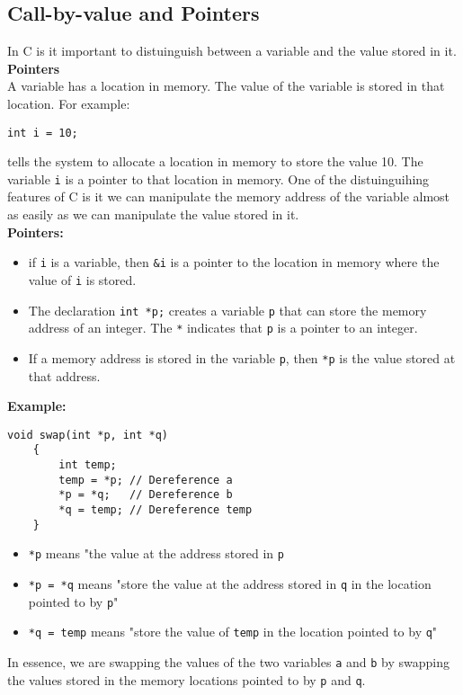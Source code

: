 \documentclass[a4paper, 10pt]{article}
\begin{document}
\subsection{Call-by-value and Pointers}
In C is it important to distuinguish between a variable and the value stored in it. \\[2ex]
\textbf{Pointers} \\
A variable has a location in memory. The value of the variable is stored in that location. For example:
\begin{lstlisting}[style=cStyle]
int i = 10;
\end{lstlisting}
tells the system to allocate a location in memory to store the value 10. The variable \texttt{i} is a pointer to that location in memory. One of the distuinguihing features of C is it we can manipulate the memory address of the variable almost as easily as we can manipulate the value stored in it. \\[2ex]
\textbf{Pointers:}
\begin{itemize}
    \item if \texttt{i} is a variable, then \texttt{\&i} is a pointer to the location in memory where the value of \texttt{i} is stored.
    \item The declaration \texttt{int *p;} creates a variable \texttt{p} that can store the memory address of an integer. The \texttt{*} indicates that \texttt{p} is a pointer to an integer.
    \item If a memory address is stored in the variable \texttt{p}, then \texttt{*p} is the value stored at that address.
\end{itemize}
\textbf{Example:}
\begin{lstlisting}[style=cStyle, caption={Swap two integers}]
    void swap(int *p, int *q)
    {
        int temp;
        temp = *p; // Dereference a
        *p = *q;   // Dereference b
        *q = temp; // Dereference temp
    }
\end{lstlisting}
\begin{itemize}
    \item \texttt{*p} means "the value at the address stored in \texttt{p}
    \item \texttt{*p = *q} means "store the value at the address stored in \texttt{q} in the location pointed to by \texttt{p}"
    \item \texttt{*q = temp} means "store the value of \texttt{temp} in the location pointed to by \texttt{q}"
\end{itemize}
In essence, we are swapping the values of the two variables \texttt{a} and \texttt{b} by swapping the values stored in the memory locations pointed to by \texttt{p} and \texttt{q}.
\end{document}
